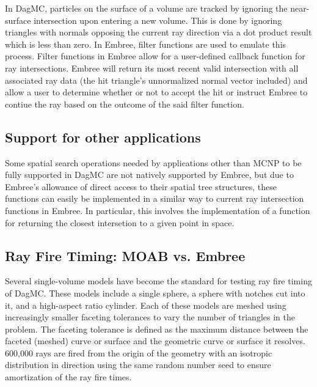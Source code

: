 \documentclass{anstrans}
\begin{document}
In DagMC, particles on the surface of a volume are tracked by ignoring the near-surface intersection upon entering a new volume. This is done by ignoring triangles with normals opposing the current ray direction via a dot product result which is less than zero. In Embree, filter functions are used to emulate this process. Filter functions in Embree allow for a user-defined callback function for ray intersections. Embree will return its most recent valid intersection with all associated ray data (the hit triangle's unnormalized normal vector included) and allow a user to determine whether or not to accept the hit or instruct Embree to contiue the ray based on the outcome of the said filter function.

\subsection{Support for other applications}

Some spatial search operations needed by applications other than MCNP to be fully supported in DagMC are not natively supported by Embree, but due to Embree's allowance of direct access to their spatial tree structures, these functions can easily be implemented in a similar way to current ray intersection functions in Embree. In particular, this involves the implementation of a function for returning the closest intersetion to a given point in space.

\subsection{Ray Fire Timing: MOAB vs. Embree}

Several single-volume models have become the standard for testing ray fire timing of DagMC. These models include a single sphere, a sphere with notches cut into it, and a high-aspect ratio cylinder. Each of these models are meshed using increasingly smaller faceting tolerances to vary the number of triangles in the problem. The faceting tolerance is defined as the maximum distance between the faceted (meshed) curve or surface and the geometric curve or surface it resolves. 600,000 rays are fired from the origin of the geometry with an isotropic distribution in direction using the same random number seed to ensure amortization of the ray fire times.

\begin{figure}

  \begin{center}


  \end{center}

\end{figure}
\end{document}

